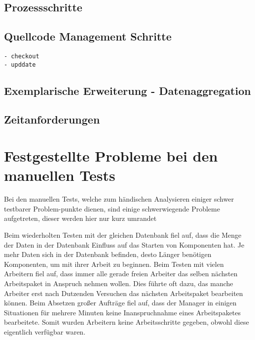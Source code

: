 \subsection{Prozessschritte}
\subsection{Quellcode Management Schritte}

\begin{verbatim}
- checkout
- upddate
\end{verbatim}

\subsection{Exemplarische Erweiterung - Datenaggregation}

\subsection{Zeitanforderungen}

\section{Festgestellte Probleme bei den manuellen Tests}

Bei den manuellen Tests, welche zum händischen Analysieren
einiger schwer testbarer Problem-punkte dienen,
sind einige schwerwiegende Probleme aufgetreten,
dieser werden hier nur kurz umrandet 

\begin{description}
        Beim wiederholten Testen mit der gleichen Datenbank fiel auf, dass die Menge der Daten in der Datenbank Einfluss auf das Starten von Komponenten hat. Je mehr Daten sich in der Datenbank befinden, desto Länger benötigen Komponenten, um mit ihrer Arbeit zu beginnen.
        Beim Testen mit vielen Arbeitern fiel auf, dass immer alle gerade freien Arbeiter das selben nächsten Arbeitspaket in Anspruch nehmen wollen. Dies führte oft dazu, das manche Arbeiter erst nach Dutzenden Versuchen das nächsten Arbeitspaket bearbeiten können.
        Beim Absetzen großer Aufträge fiel auf, dass der Manager in einigen Situationen für mehrere Minuten keine Inanspruchnahme eines Arbeitspaketes bearbeitete. Somit wurden Arbeitern keine Arbeitsschritte gegeben, obwohl diese eigentlich verfügbar waren.
\end{description}

